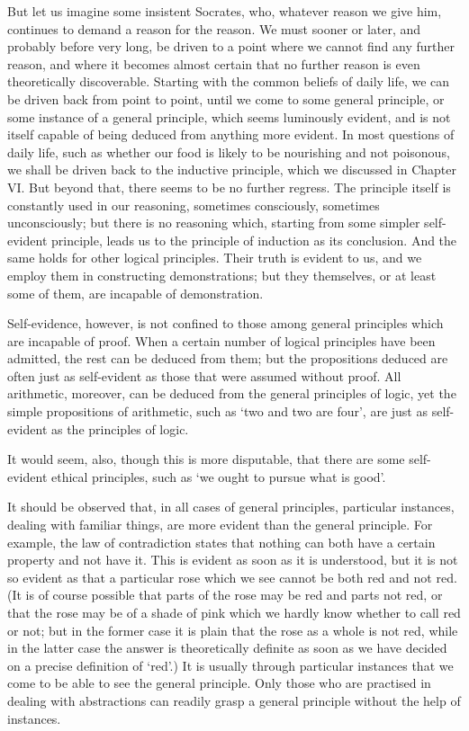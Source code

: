 \documentclass[oneside,letterpaper,12pt]{book}
\begin{document}
\label{socrates} But let us imagine some insistent Socrates, who, whatever reason we give
him, continues to demand a reason for the reason. We must sooner or
later, and probably before very long, be driven to a point where we
cannot find any further reason, and where it becomes almost certain that
no further reason is even theoretically discoverable. Starting with the
common beliefs of daily life, we can be driven back from point to point,
until we come to some general principle, or some instance of a general
principle, which seems luminously evident, and is not itself capable of
being deduced from anything more evident. In most questions of daily
life, such as whether our food is likely to be nourishing and not
poisonous, we shall be driven back to the inductive principle, which we
discussed in Chapter VI. But beyond that, there seems to be no further
regress. The principle itself is constantly used in our reasoning,
sometimes consciously, sometimes unconsciously; but there is no
reasoning which, starting from some simpler self-evident principle,
leads us to the principle of induction as its conclusion. And the same
holds for other logical principles. Their truth is evident to us, and we
employ them in constructing demonstrations; but they themselves, or at
least some of them, are incapable of demonstration.

Self-evidence, however, is not confined to those among general
principles which are incapable of proof. When a certain number of
logical principles have been admitted, the rest can be deduced from
them; but the propositions deduced are often just as self-evident as
those that were assumed without proof. All arithmetic, moreover, can be
deduced from the general principles of logic, yet the simple
propositions of arithmetic, such as `two and two are
four', are just as self-evident as the principles of
logic.

\label{selfevident} It would seem, also, though this is more disputable, that there are some
self-evident ethical principles, such as `we ought to
pursue what is good'.

It should be observed that, in all cases of general principles,
particular instances, dealing with familiar things, are more evident
than the general principle. For example, the law of contradiction states
that nothing can both have a certain property and not have it. This is
evident as soon as it is understood, but it is not so evident as that a
particular rose which we see cannot be both red and not red. (It is of
course possible that parts of the rose may be red and parts not red, or
that the rose may be of a shade of pink which we hardly know whether to
call red or not; but in the former case it is plain that the rose as a
whole is not red, while in the latter case the answer is theoretically
definite as soon as we have decided on a precise definition of
`red'.) It is usually through particular
instances that we come to be able to see the general principle. Only
those who are practised in dealing with abstractions can readily grasp a
general principle without the help of instances.
\end{document}
